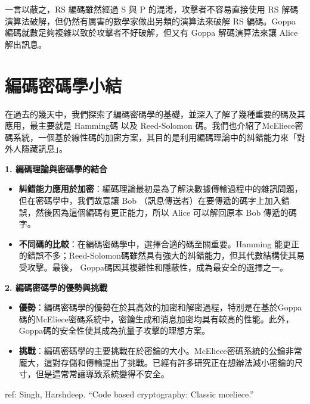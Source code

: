 \documentclass[
]{article}
\begin{document}
一言以蔽之，RS 編碼雖然經過 S 與 P 的混淆，攻擊者不容易直接使用 RS
解碼演算法破解，但仍然有厲害的數學家做出另類的演算法來破解 RS
編碼。Goppa 編碼就數足夠複雜以致於攻擊者不好破解，但又有 Goppa
解碼演算法來讓 Alice 解出訊息。

\hypertarget{ux7de8ux78bcux5bc6ux78bcux5b78ux5c0fux7d50}{%
\section{編碼密碼學小結}\label{ux7de8ux78bcux5bc6ux78bcux5b78ux5c0fux7d50}}

在過去的幾天中，我們探索了編碼密碼學的基礎，並深入了解了幾種重要的碼及其應用，最主要就是
Hamming碼 以及 Reed-Solomon
碼。我們也介紹了McEliece密碼系統，一個基於線性碼的加密方案，其目的是利用編碼理論中的糾錯能力來「對外人隱藏訊息」。

\textbf{1. 編碼理論與密碼學的結合}

\begin{itemize}
\item
  \textbf{糾錯能力應用於加密}：編碼理論最初是為了解決數據傳輸過程中的雜訊問題，但在密碼學中，我們故意讓
  Bob
  （訊息傳送者）在要傳遞的碼字上加入錯誤，然後因為這個編碼有更正能力，所以
  Alice 可以解回原本 Bob 傳遞的碼字。
\item
  \textbf{不同碼的比較}：在編碼密碼學中，選擇合適的碼至關重要。Hamming
  能更正的錯誤不多；Reed-Solomon碼雖然具有強大的糾錯能力，但其代數結構使其易受攻擊。最後，
  Goppa碼因其複雜性和隱蔽性，成為最安全的選擇之一。
\end{itemize}

\textbf{2. 編碼密碼學的優勢與挑戰}

\begin{itemize}
\item
  \textbf{優勢}：編碼密碼學的優勢在於其高效的加密和解密過程，特別是在基於Goppa碼的McEliece密碼系統中，密鑰生成和消息加密均具有較高的性能。此外，Goppa碼的安全性使其成為抗量子攻擊的理想方案。
\item
  \textbf{挑戰}：編碼密碼學的主要挑戰在於密鑰的大小。McEliece密碼系統的公鑰非常龐大，這對存儲和傳輸提出了挑戰。已經有許多研究正在想辦法減小密鑰的尺寸，但是這常常讓導致系統變得不安全。
\end{itemize}

ref: Singh, Harshdeep. ``Code based cryptography: Classic mceliece.''
\end{document}
